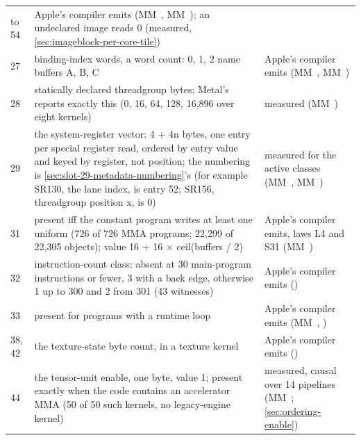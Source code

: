 \begin{xltabular}{\linewidth}{@{}l>{\hsize}X>{\hsize}X@{}}
to 54 & Apple's compiler emits (MM~, MM~);
an undeclared image reads 0 (measured, 
\cref{sec:imageblock-per-core-tile}) \\
27 & binding-index words, a word count: 0, 1, 2 name buffers A, B, C & Apple's compiler emits (MM~, MM~) \\
28 & statically declared threadgroup bytes; Metal's
 reports exactly this (0, 16, 64,
128, 16,896 over eight kernels) & measured (MM~) \\
29 & the system-register vector: 4 + 4n bytes, one entry per special register
read, ordered by entry value and keyed by register, not position; the
numbering is 
\cref{sec:slot-29-metadata-numbering}'s (for example
SR130, the lane index, is entry 52; SR156, threadgroup position x, is 0) & measured for the active classes (MM~, MM~) \\
31 & present iff the constant program writes at least one uniform (726 of 726
MMA programs; 22,299 of 22,305 objects); value 16 + 16 × ceil(buffers /
2) & Apple's compiler emits, laws L4 and S31 (MM~) \\
32 & instruction-count class: absent at 30 main-program instructions or
fewer, 3 with a back edge, otherwise 1 up to 300 and 2 from 301 (43
witnesses) & Apple's compiler emits () \\
33 & present for programs with a runtime loop & Apple's compiler emits (MM~,
) \\
38, 42 & the texture-state byte count, in a texture kernel & Apple's compiler emits () \\
44 & the tensor-unit enable, one byte, value 1; present exactly when the code
contains an accelerator MMA (50 of 50 such kernels, no legacy-engine
kernel) & measured, causal over 14 pipelines (MM~; 
\cref{sec:ordering-enable}) \\
\bottomrule
\end{xltabular}

